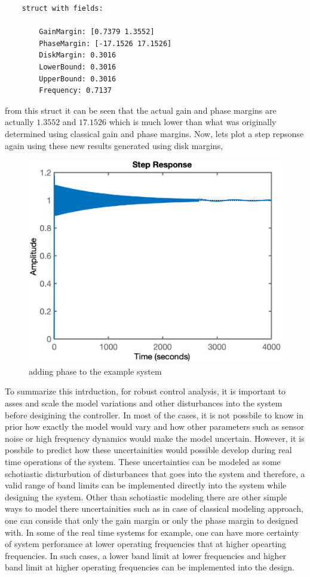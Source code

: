 \begin{lstlisting}
	struct with fields:
	
		GainMargin: [0.7379 1.3552]
		PhaseMargin: [-17.1526 17.1526]
		DiskMargin: 0.3016
		LowerBound: 0.3016
		UpperBound: 0.3016
		Frequency: 0.7137
\end{lstlisting}
from this struct it can be seen that the actual gain and phase margins are actually $1.3552$ and $17.1526$ which is much lower than what was originally determined using classical gain and phase margins. Now, lets plot a step repsonse again using these new results generated using disk margins,
\begin{figure}[h!]
	\centering
	\includegraphics[width=0.75\linewidth]{Bilder/Matlab_RobustControl_Intro_5.eps}
	\caption{adding phase to the example system}
	\label{fig_2_ch_RC_intro_5}
\end{figure}
\newpage
To summarize this intrduction, for robust control analysis, it is important to asses and scale the model variations and other disturbances into the system before desigining the controller. In most of the cases, it is not possbile to know in prior how exactly the model would vary and how other parameters such as sensor noise or high frequency dynamics would make the model uncertain. However, it is possbile to predict how these uncertainities would possible develop during real time operations of the system. These uncertainties can be modeled as some schotiastic disturbution of disturbances that goes into the system and therefore, a valid range of band limits can be implemented directly into the system while designing the system. Other than schotiastic modeling there are other simple ways to model there uncertainities such as in case of classical modeling approach, one can conside that only the gain margin or only the phase margin to designed with. In some of the real time systems for example, one can have more certainty of system perforamce at lower operating frequencies that at higher opearting frequencies. In such cases, a lower band limit at lower frequencies and higher band limit at higher operating frequencies can be implemented into the design.

